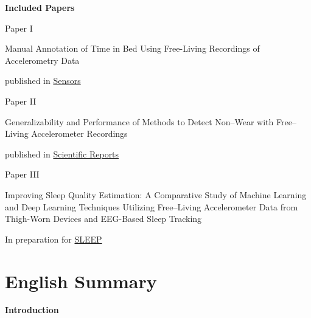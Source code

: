 \documentclass[
  9pt,
]{scrbook}
\newcommand{\aftertocpagenum}{
   \cleardoublepage
   \pagenumbering{arabic}
 }
\renewcommand*\contentsname{Table of contents}
\newcommand\contentsname{Table of contents}
\begin{document}
\newpage

\textsf{\textbf{\Large{Included Papers}}}

\vspace{2cm}

\begin{center}

Paper I

\textsf{Manual Annotation of Time in Bed Using Free-Living Recordings of Accelerometry Data}

published in \href{https://doi.org/10.3390/s21248442}{Sensors}

\vspace{2cm}
Paper II

\textsf{Generalizability and Performance of Methods to Detect Non–Wear with Free–Living Accelerometer Recordings}

published in \href{https://doi.org/10.1038/s41598-023-29666-x}{Scientific Reports}

\vspace{2cm}
Paper III 

\textsf{Improving Sleep Quality Estimation: A Comparative Study of Machine Learning and Deep Learning Techniques Utilizing Free–Living Accelerometer Data from Thigh-Worn Devices and EEG-Based Sleep Tracking}

In preparation for \href{https://academic.oup.com/sleep}{SLEEP}

\end{center}\renewcommand*\contentsname{Table of contents}
{
\hypersetup{linkcolor=}
\setcounter{tocdepth}{2}
\tableofcontents
}
\listoffigures
\listoftables
\mainmatter
\aftertocpagenum

\hypertarget{english-summary}{%
\chapter{English Summary}\label{english-summary}}

\textbf{Introduction}
\end{document}
